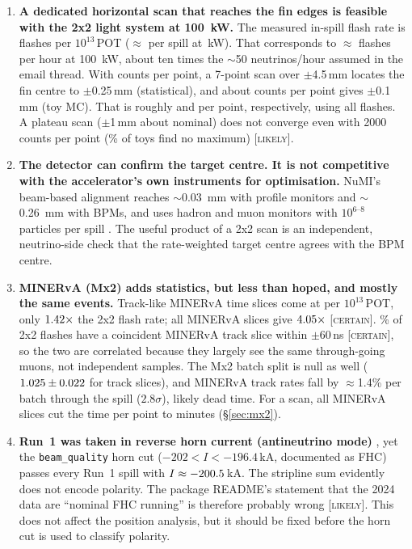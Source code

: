 \documentclass[11pt]{article}
\newcommand{\CERT}{\textsc{[certain]}}
\newcommand{\LIK}{\textsc{[likely]}}
\begin{document}
\begin{enumerate}
later batches and never into batch~1. Measured from the post-spill tail, this biases
$R_1/R_{2\text{--}6}$ by \FBbias\% for all flashes and \FBtwoBias\% for flashes lighting
$\geq$2 TPCs \LIK. Both are larger than the $\sim$0.2\% interception signal expected for a
centred beam. No pile-up \emph{loss} is seen: later batches have, if anything, more flashes
after an earlier one (batch~6: $\MaskSix\pm\MaskSixErr$) (\S\ref{sec:syst}).
\item \textbf{A dedicated horizontal scan that reaches the fin edges is feasible with the
2x2 light system at \SI{100}{kW}.} The measured in-spill flash rate is \FRperEthirteen{}
flashes per $10^{13}$\,POT ($\approx$\FRperSpill{} per spill at \FRpowerKw\,kW). That
corresponds to $\approx$\FRperHourScan{} flashes per hour at \SI{100}{kW}, about ten times
the $\sim$50 neutrinos/hour assumed in the email thread. With \CountsQuarter{} counts per
point, a 7-point scan over $\pm$4.5\,mm locates the fin centre to $\pm$0.25\,mm
(statistical), and about \CountsTenth{} counts per point gives $\pm$0.1\,mm (toy MC).
That is roughly \TQuarterAll{} and \TTenthAll{} per point, respectively, using all flashes. A plateau scan
($\pm$1\,mm about nominal) does not converge even with 2000 counts per point
(\NarrowTwoKfail\% of toys find no maximum) \LIK.
\item \textbf{The detector can confirm the target centre. It is not competitive with the
accelerator's own instruments for optimisation.} NuMI's beam-based alignment reaches
$\sim$\SI{0.03}{mm} with profile monitors and $\sim$\SI{0.26}{mm} with BPMs, and uses
hadron and muon monitors with $10^{6\text{--}8}$ particles per spill
\cite{zwaska2006}. The useful product of a 2x2 scan is an independent,
neutrino-side check that the rate-weighted target centre agrees with the BPM centre.
\item \textbf{MINERvA (Mx2) adds statistics, but less than hoped, and mostly the same
events.} Track-like MINERvA time slices come at \MXtrkPerEthirteen{} per $10^{13}$\,POT,
only $1.42\times$ the 2x2 flash rate; all MINERvA slices give $4.05\times$
\CERT. \CDtrkFrac\% of 2x2 flashes have a coincident MINERvA track slice within
$\pm$60\,ns \CERT, so the two are correlated because they largely see the same through-going
muons, not independent samples. The Mx2 batch split is null as well
($1.025\pm0.022$ for track slices), and MINERvA track rates fall by
$\approx$1.4\% per batch through the spill ($2.8\sigma$), likely dead time. For a scan,
all MINERvA slices cut the time per point to minutes (\S\ref{sec:mx2}).
\item \textbf{Run~1 was taken in reverse horn current (antineutrino mode)}
\cite{nufact2024}, yet the \texttt{beam\_quality} horn cut ($-202<I<-196.4$\,kA,
documented as FHC) passes every Run~1 spill with $I\approx-200.5$\,kA. The stripline sum
evidently does not encode polarity. The package README's statement that the 2024 data
are ``nominal FHC running'' is therefore probably wrong \LIK. This does not affect the
position analysis, but it should be fixed before the horn cut is used to classify
polarity.
\end{enumerate}
\end{document}

